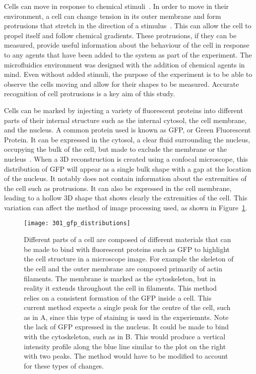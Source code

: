 Cells can move in response to chemical stimuli~\cite{Stetler:93}. In order to move in their environment, a cell can change tension in its outer membrane and form protrusions that stretch in the direction of a stimulus~\cite{Stetler:93}. This can allow the cell to propel itself and follow chemical gradients. These protrusions, if they can be measured, provide useful information about the behaviour of the cell in response to any agents that have been added to the system as part of the experiment. The microfluidics environment was designed with the addition of chemical agents in mind. Even without added stimuli, the purpose of the experiment is to be able to observe the cells moving and allow for their shapes to be measured. Accurate recognition of cell protrusions is a key aim of this study.

Cells can be marked by injecting a variety of fluorescent proteins into different parts of their internal structure such as the internal cytosol, the cell membrane, and the nucleus. A common protein used is known as GFP, or Green Fluorescent Protein. It can be expressed in the cytosol, a clear fluid surrounding the nucleus, occupying the bulk of the cell, but made to exclude the membrane or the nucleus~\cite{Zou:05}. When a 3D reconstruction is created using a confocal microscope, this distribution of GFP will appear as a single bulk shape with a gap at the location of the nucleus. It notably does not contain information about the extremities of the cell such as protrusions. It can also be expressed in the cell membrane, leading to a hollow 3D shape that shows clearly the extremities of the cell. This variation can affect the method of image processing used, as shown in Figure~\ref{fig:gfpdistributions}.

\begin{figure}[h!]
 \centering
 \texttt{[image: 301\_gfp\_distributions]}
 \caption[Possible GFP distributions]{
	Different parts of a cell are composed of different materials that can be made to bind with fluorescent proteins such as GFP to highlight the cell structure in a microscope image. For example the skeleton of the cell and the outer membrane are composed primarily of actin filaments. The membrane is marked as the cytoskeleton, but in reality it extends throughout the cell in filaments. This method relies on a consistent formation of the GFP inside a cell. This current method expects a single peak for the centre of the cell, such as in A, since this type of staining is used in the experiemnts. Note the lack of GFP expressed in the nucleus. It could be made to bind with the cytoskeleton, such as in B. This would produce a vertical intensity profile along the blue line similar to the plot on the right with two peaks. The method would have to be modified to account for these types of changes.
 }
 \label{fig:gfpdistributions}
\end{figure}

